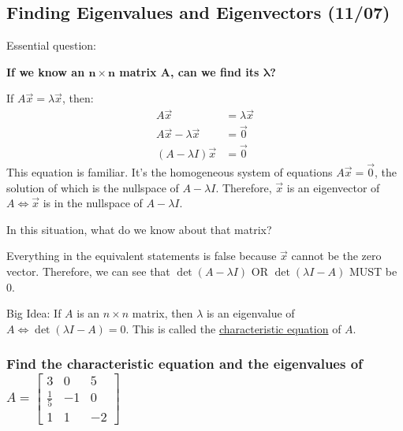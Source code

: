 \documentclass[
  letterpaper,
  DIV=11,
  numbers=noendperiod]{scrartcl}
\begin{document}
\subsection{Finding Eigenvalues and Eigenvectors
(11/07)}\label{finding-eigenvalues-and-eigenvectors-1107}

Essential question:

\textbf{If we know an \(\symbf{n \times n}\) matrix \(\symbf{A}\), can
we find its \(\symbf{\lambda}\)?}

If \(A\vec{x} = \lambda\vec{x}\), then: \begin{align*}
A\vec{x} &= \lambda\vec{x} \\
A\vec{x} - \lambda\vec{x} &= \vec{0} \\
(A-\lambda I)\vec{x} &= \vec{0}
\end{align*} This equation is familiar. It's the homogeneous system of
equations \(A\vec{x} = \vec{0}\), the solution of which is the nullspace
of \(A-\lambda I\). Therefore, \(\vec{x}\) is an eigenvector of
\(A \iff \vec{x}\) is in the nullspace of \(A-\lambda I\).

In this situation, what do we know about that matrix?

Everything in the equivalent statements is false because \(\vec{x}\)
cannot be the zero vector. Therefore, we can see that
\(\det(A-\lambda I)\) OR \(\det(\lambda I-A)\) MUST be 0.

Big Idea: If \(A\) is an \(n \times n\) matrix, then \(\lambda\) is an
eigenvalue of \(A \iff \det(\lambda I-A) = 0\). This is called the
\ul{characteristic equation} of \(A\).

\subsubsection{\texorpdfstring{Find the characteristic equation and the
eigenvalues of
\(A=\begin{bmatrix}3 & 0 & 5\\ \frac{1}{5} & -1 & 0 \\ 1 & 1 & -2\end{bmatrix}\)}{Find the characteristic equation and the eigenvalues of A=\textbackslash begin\{bmatrix\}3 \& 0 \& 5\textbackslash\textbackslash{} \textbackslash frac\{1\}\{5\} \& -1 \& 0 \textbackslash\textbackslash{} 1 \& 1 \& -2\textbackslash end\{bmatrix\}}}\label{find-the-characteristic-equation-and-the-eigenvalues-of-abeginbmatrix3-0-5-frac15--1-0-1-1--2endbmatrix}
\end{document}
